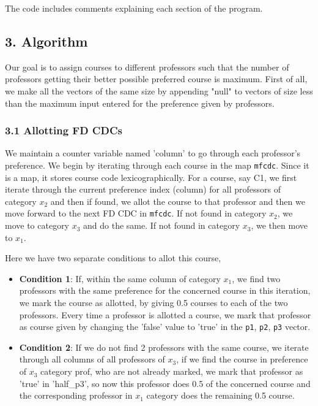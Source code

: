 \documentclass{article}
\begin{document}
The code includes comments explaining each section of the program.

\subsection*{3. Algorithm}

Our goal is to assign courses to different professors such that the number of professors getting their better possible preferred course is maximum. First of all, we make all the vectors of the same size by appending "null" to vectors of size less than the maximum input entered for the preference given by professors.

\subsubsection*{3.1 Allotting FD CDCs}

We maintain a counter variable named 'column' to go through each professor's preference. We begin by iterating through each course in the map \texttt{mfcdc}. Since it is a map, it stores course code lexicographically. For a course, say C1, we first iterate through the current preference index (column) for all professors of category $x_2$ and then if found, we allot the course to that professor and then we move forward to the next FD CDC in \texttt{mfcdc}. If not found in category $x_2$, we move to category $x_3$ and do the same. If not found in category $x_3$, we then move to $x_1$.

Here we have two separate conditions to allot this course,

\begin{itemize}
    \item \textbf{Condition 1}: If, within the same column of category $x_1$, we find two professors with the same preference for the concerned course in this iteration, we mark the course as allotted, by giving 0.5 courses to each of the two professors. Every time a professor is allotted a course, we mark that professor as course given by changing the 'false' value to 'true' in the \texttt{p1}, \texttt{p2}, \texttt{p3} vector.
    
    \item \textbf{Condition 2}: If we do not find 2 professors with the same course, we iterate through all columns of all professors of $x_3$, if we find the course in preference of $x_3$ category prof, who are not already marked, we mark that professor as 'true' in 'half\_p3', so now this professor does 0.5 of the concerned course and the corresponding professor in $x_1$ category does the remaining 0.5 course.
\end{itemize}
\end{document}
